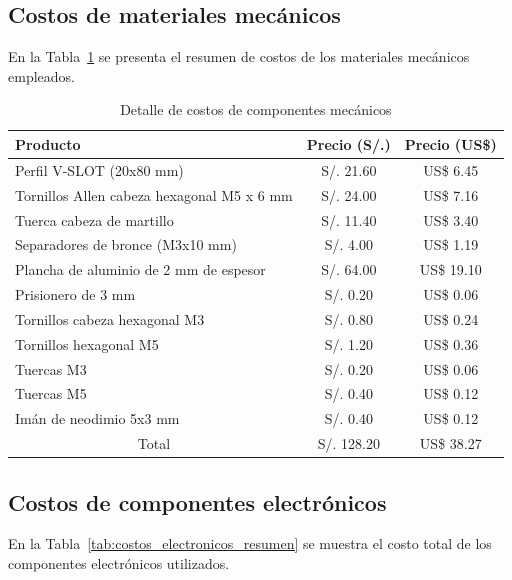 \subsection{Costos de materiales mecánicos}

\noindent
En la Tabla~\ref{tab:costos_materias_mecanicos} se presenta el resumen de costos de los materiales mecánicos empleados.

\begin{table}[H]
\centering
\caption{Detalle de costos de componentes mecánicos}
\label{tab:costos_materias_mecanicos}

\vspace{0.5em}

\begin{tabular}{|p{7cm}||c|c|}
\hline
Producto & Precio (S/.) & Precio (US\$) \\
\hline
Perfil V-SLOT (20x80 mm) & S/. 21.60 & US\$ 6.45 \\
\hline
Tornillos Allen cabeza hexagonal M5 x 6 mm & S/. 24.00 & US\$ 7.16 \\
\hline
Tuerca cabeza de martillo & S/. 11.40 & US\$ 3.40 \\
\hline
Separadores de bronce (M3x10 mm) & S/. 4.00 & US\$ 1.19 \\
\hline
Plancha de aluminio de 2 mm de espesor & S/. 64.00 & US\$ 19.10 \\
\hline
Prisionero de 3 mm & S/. 0.20 & US\$ 0.06 \\
\hline
Tornillos cabeza hexagonal M3 & S/. 0.80 & US\$ 0.24 \\
\hline
Tornillos hexagonal M5 & S/. 1.20 & US\$ 0.36 \\
\hline
Tuercas M3 & S/. 0.20 & US\$ 0.06 \\
\hline
Tuercas M5 & S/. 0.40 & US\$ 0.12 \\
\hline
Imán de neodimio 5x3 mm & S/. 0.40 & US\$ 0.12 \\
\hline
\multicolumn{1}{|c||}{Total} & S/. 128.20 & US\$ 38.27 \\
\hline
\end{tabular}
\end{table}

\subsection{Costos de componentes electrónicos}

\noindent
En la Tabla~\ref{tab:costos_electronicos_resumen} se muestra el costo total de los componentes electrónicos utilizados.


